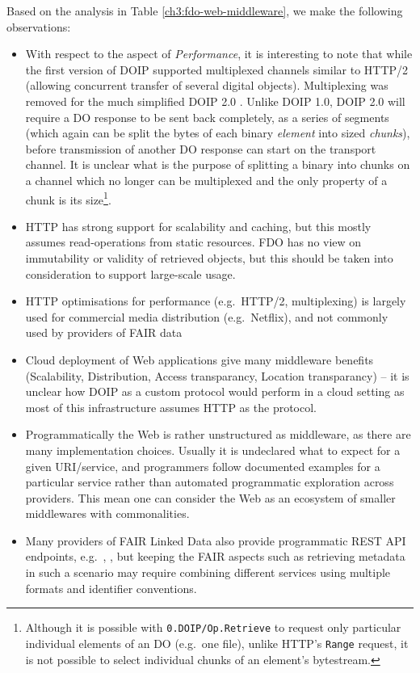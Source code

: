 Based on the analysis in Table \vref{ch3:fdo-web-middleware}, we make the following observations:

\begin{itemize}
  \item
    With respect to the aspect of \emph{Performance}, it is interesting to note that while the first version of DOIP \cite{DigitalObjectInterface} supported multiplexed channels similar to HTTP/2 (allowing concurrent transfer of several digital objects). Multiplexing was removed for the much simplified DOIP 2.0 \cite{DONA 2018}. Unlike DOIP 1.0, DOIP 2.0 will require a DO response to be sent back completely, as a series of segments (which again can be split the bytes of each binary \emph{element} into sized \emph{chunks}), before transmission of another DO response can start on the transport channel. It is unclear what is the purpose of splitting a binary into chunks on a channel which no longer can be multiplexed and the only property of a chunk is its size\footnote{Although it is possible with \texttt{0.DOIP/Op.Retrieve} to request only particular individual elements of an DO (e.g.~one file), unlike HTTP's \texttt{Range} request, it is not possible to select individual chunks of an element's bytestream.}.
  \item
    HTTP has strong support for scalability and caching, but this mostly assumes read-operations from static resources. FDO has no view on immutability or validity of retrieved objects, but this should be taken into consideration to support large-scale usage.
  \item
    HTTP optimisations for performance (e.g.~HTTP/2, multiplexing) is largely used for commercial media distribution (e.g.~Netflix), and not commonly used by providers of FAIR data
  \item
    Cloud deployment of Web applications give many middleware benefits (Scalability, Distribution, Access transparancy, Location transparancy) -- it is unclear how DOIP as a custom protocol would perform in a cloud setting as most of this infrastructure assumes HTTP as the protocol.
  \item
    Programmatically the Web is rather unstructured as middleware, as there are many implementation choices. Usually it is undeclared what to expect for a given URI/service, and programmers follow documented examples for a particular service rather than automated programmatic exploration across providers. This mean one can consider the Web as an ecosystem of smaller middlewares with commonalities.
  \item
    Many providers of FAIR Linked Data also provide programmatic REST API endpoints, e.g.~, , but keeping the FAIR aspects such as retrieving metadata in such a scenario may require combining different services using multiple formats and identifier conventions.
\end{itemize}


